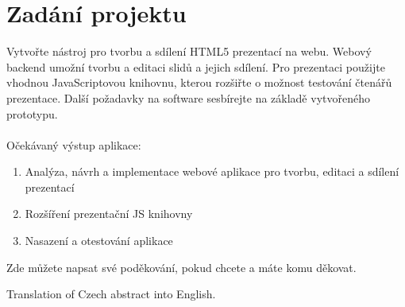 \documentclass[11pt,twoside,a4paper]{book}
\begin{document}
	
	\translate				%

	{
	 \cleardoublepage \thispagestyle{empty}
	\chapter*{Zadání projektu}
	Vytvořte nástroj pro tvorbu a sdílení HTML5 prezentací na webu. Webový backend umožní  tvorbu a editaci slidů a jejich sdílení. Pro prezentaci použijte vhodnou JavaScriptovou knihovnu, kterou rozšiřte o možnost testování čtenářů prezentace. Další požadavky na software sesbírejte na základě vytvořeného prototypu.\\\\
	
	\noindent Očekávaný výstup aplikace:
	\begin{enumerate}
		\item Analýza, návrh a implementace webové aplikace pro tvorbu, editaci a sdílení prezentací
		\item Rozšíření prezentační JS knihovny
		\item Nasazení a otestování aplikace
	\end{enumerate}
	\newpage
	}

	\coverpagestarts


	\acknowledgements
	\noindent
	Zde můžete napsat své poděkování, pokud chcete a máte komu děkovat.





 
	\abstractpage

	Translation of Czech abstract into English.
\end{document}
